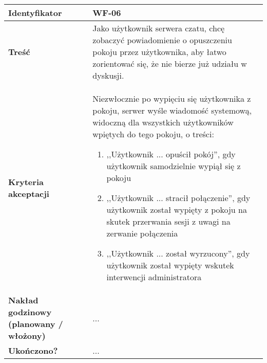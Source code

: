 \begin{tabular}{ | l | l | }
	\hline
		\textbf{Identyfikator} &
		WF-06
		\\

	\hline
		\textbf{Treść} & \parbox[t]{11.5cm}{\strut
			Jako użytkownik serwera czatu, chcę zobaczyć
			powiadomienie o opuszczeniu pokoju przez użytkownika,
			aby łatwo zorientować się, że nie bierze już udziału
			w dyskusji.
		\strut}\\

	\hline
		\parbox[t]{4cm}{\textbf{Kryteria akceptacji}} & \parbox[t]{11.5cm}{\strut
			\begin{enumreq}
				\item Niezwłocznie po wypięciu się użytkownika z
				pokoju, serwer wyśle wiadomość systemową, widoczną
				dla wszystkich użytkowników wpiętych do tego pokoju,
				o treści:
				\begin{enumerate}
					\item ,,Użytkownik ... opuścił pokój'', gdy
					użytkownik samodzielnie wypiął się z pokoju
					\item ,,Użytkownik ... stracił połączenie'',
					gdy użytkownik został wypięty z pokoju na skutek
					przerwania sesji z uwagi na zerwanie połączenia
					\item ,,Użytkownik ... został wyrzucony'', gdy
					użytkownik został wypięty wskutek interwencji
					administratora
				\end{enumerate}
			\end{enumreq}
			\strut}
		\\

	\hline

  \parbox[t]{4cm}{\textbf{Nakład godzinowy (planowany / włożony)}} &
  \parbox[t]{11.5cm}{\strut
    ...
  \strut}\\

  \hline
    \parbox[t]{4cm}{\textbf{Ukończono?}} &
    \parbox[t]{11.5cm}{\strut
      ...
    \strut}\\
\hline
\end{tabular}

\vspace{1em}

